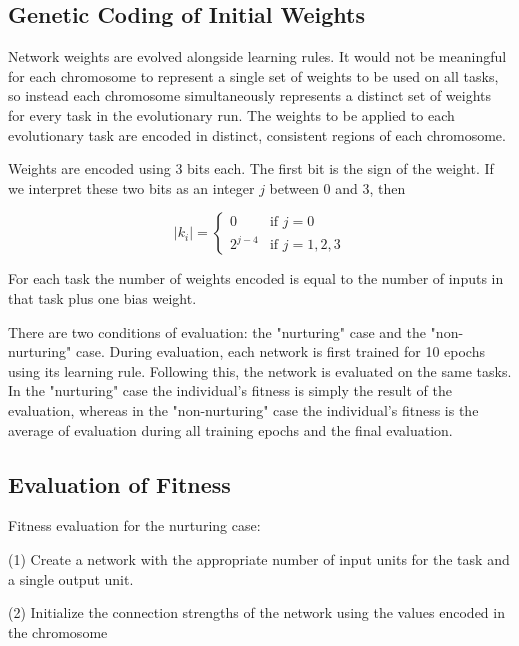 \documentclass[master]{outhesis}
\begin{document}
\subsection{Genetic Coding of Initial Weights}

Network weights are evolved alongside learning rules. It would not be meaningful for each chromosome to represent a single set of weights to be used on all tasks, so instead each chromosome simultaneously represents a distinct set of weights for every task in the evolutionary run. The weights to be applied to each evolutionary task are encoded in distinct, consistent regions of each chromosome. 

\newcommand{\bitsperweight}{3}
\newcommand{\jlen}{2}
\newcommand{\jmin}{0}
\newcommand{\jmax}{3}
\newcommand{\exponentshift}{4}

Weights are encoded using 3 bits each. The first bit is the sign of the weight. If we interpret these two bits as an integer $j$ between 0 and 3, then

\[
	|k_i|=
	\begin{cases}
		0 & \text{if $j = 0$}\\
		2^{j-4} & \text{if $j = 1, 2, 3$}
	\end{cases}
\]

For each task the number of weights encoded is equal to the number of inputs in that task plus one bias weight.

There are two conditions of evaluation: the "nurturing" case and the "non-nurturing" case. During evaluation, each network is first trained for 10 epochs using its learning rule. Following this, the network is evaluated on the same tasks. In the "nurturing" case the individual's fitness is simply the result of the evaluation, whereas in the "non-nurturing" case the individual's fitness is the average of evaluation during all training epochs and the final evaluation.

\subsection{Evaluation of Fitness}

Fitness evaluation for the nurturing case:

(1) Create a network with the appropriate number of input units for the task and a single output unit.

(2) Initialize the connection strengths of the network using the values encoded in the chromosome
\end{document}

